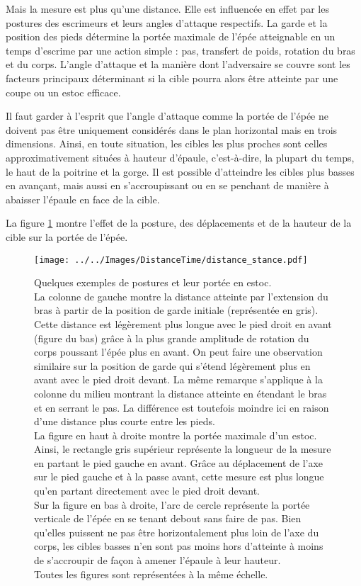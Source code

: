 Mais la mesure est plus qu'une distance.
Elle est influencée en effet par les postures des escrimeurs et leurs angles d'attaque respectifs.
La garde et la position des pieds détermine la portée maximale de l'épée atteignable en un temps d'escrime par une action simple : pas, transfert de poids, rotation du bras et du corps.
L'angle d'attaque et la manière dont l'adversaire se couvre sont les facteurs principaux déterminant si la cible pourra alors être atteinte par une coupe ou un estoc efficace.

Il faut garder à l'esprit que l'angle d'attaque comme la portée de l'épée ne doivent pas être uniquement considérés dans le plan horizontal mais en trois dimensions.
Ainsi, en toute situation, les cibles les plus proches sont celles approximativement situées à hauteur d'épaule, c'est-à-dire, la plupart du temps, le haut de la poitrine et la gorge.
Il est possible d'atteindre les cibles plus basses en avançant, mais aussi en s'accroupissant ou en se penchant de manière à abaisser l'épaule en face de la cible.

La figure \ref{fig:distance_stance} montre l'effet de la posture, des déplacements et de la hauteur de la cible sur la portée de l'épée.

\begin{figure}[ht]
\centering
	\texttt{[image: ../../Images/DistanceTime/distance\_stance.pdf]}
	\caption[Posture et mesure]{Quelques exemples de postures et leur portée en estoc.\\
	La colonne de gauche montre la distance atteinte par l'extension du bras à partir de la position de garde initiale (représentée en gris). Cette distance est légèrement plus longue avec le pied droit en avant (figure du bas) grâce à la plus grande amplitude de rotation du corps poussant l'épée plus en avant. On peut faire une observation similaire sur la position de garde qui s'étend légèrement plus en avant avec le pied droit devant. La même remarque s'applique à la colonne du milieu montrant la distance atteinte en étendant le bras et en serrant le pas. La différence est toutefois moindre ici en raison d'une distance plus courte entre les pieds.\\
	La figure en haut à droite montre la portée maximale d'un estoc. Ainsi, le rectangle gris supérieur représente la longueur de la mesure en partant le pied gauche en avant. Grâce au déplacement de l'axe sur le pied gauche et à la passe avant, cette mesure est plus longue qu'en partant directement avec le pied droit devant.\\
	Sur la figure en bas à droite, l'arc de cercle représente la portée verticale de l'épée en se tenant debout sans faire de pas. Bien qu'elles puissent ne pas être horizontalement plus loin de l'axe du corps, les cibles basses n'en sont pas moins hors d'atteinte à moins de s'accroupir de façon à amener l'épaule à leur hauteur.\\
	Toutes  les figures sont représentées à la même échelle.}
	\label{fig:distance_stance}
\end{figure}


